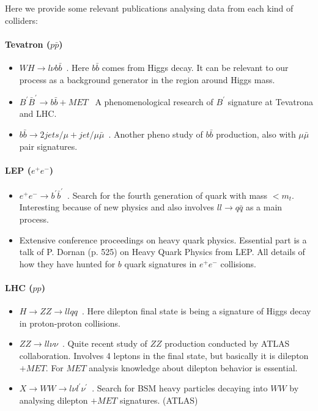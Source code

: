 \documentclass{article}
\begin{document}
Here we provide some relevant publications analysing data from each kind of colliders:

\paragraph{Tevatron ($p \bar{p}$)}

\begin{itemize}
    \item $WH \rightarrow l \nu b \bar{b}$~\cite{brown2011search}. Here $b \bar{b}$ comes from Higgs decay. It can be relevant to our process as a background generator in the region around Higgs mass.
    \item $B^\prime \bar{B}^\prime \rightarrow b \bar{b} + MET$~\cite{Alwall_2011} A phenomenological research of $B^\prime$ signature at Tevatrona and LHC\@.
    \item $b \bar{b} \rightarrow 2jets/\mu + jet/\mu \bar{\mu}$~\cite{Happacher_2006}. Another pheno study of $b \bar{b}$ production, also with $\mu \bar{\mu}$ pair signatures.
\end{itemize}

\paragraph{LEP ($e^{+} e^{-}$)}

\begin{itemize}
    \item $e^{+}e^{-} \rightarrow b^\prime \bar{b}^\prime$~\cite{PhysRevD.42.1429}. Search for the fourth generation of quark with mass $< m_t$. Interesting because of new physics and also involves $ll \rightarrow q\bar{q}$ as a main process.
    \item Extensive conference proceedings on heavy quark physics. Essential part is a talk of P. Dornan (p. 525) on Heavy Quark Physics from LEP\@. All details of how they have hunted for $b$ quark signatures in $e^{+} e^{-}$ collisions.~\cite{osti_542810}
\end{itemize}

\paragraph{LHC ($pp$)}

\begin{itemize}
    \item $H \rightarrow ZZ \rightarrow llqq$~\cite{Aad_2012}. Here dilepton final state is being a signature of Higgs decay in proton-proton collisions.
    \item $ZZ \rightarrow ll\nu\nu$~\cite{Aaboud_2019}. Quite recent study of $ZZ$ production conducted by ATLAS collaboration. Involves 4 leptons in the final state, but basically it is dilepton $+ MET$. For $MET$ analysis knowledge about dilepton behavior is essential.
    \item $X \rightarrow WW \rightarrow l \nu l^\prime \nu^\prime$~\cite{Aad_2013}. Search for BSM heavy particles decaying into $WW$ by analysing dilepton $+MET$ signatures. (ATLAS)
\end{itemize}
\end{document}
